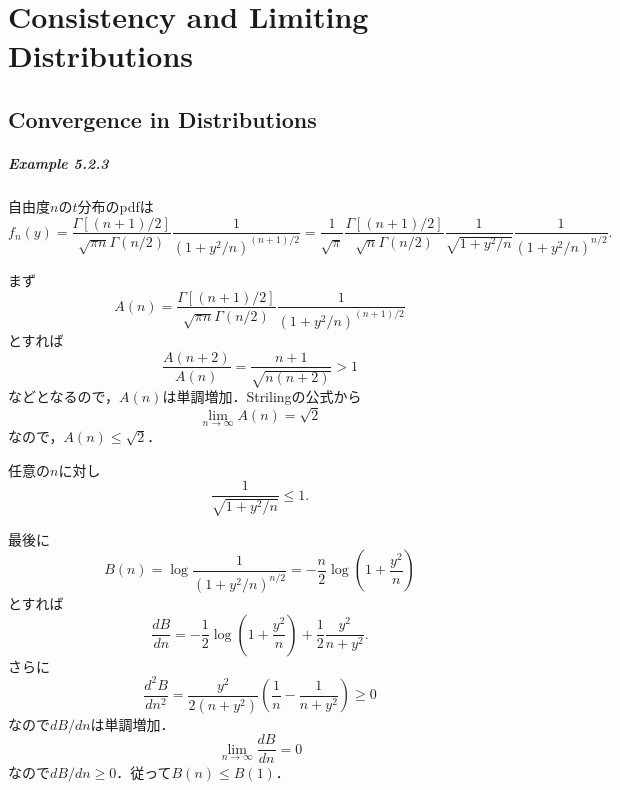 \chapter{Consistency and Limiting Distributions}
\setcounter{section}{1}
\section{Convergence in Distributions}
\paragraph{Example 5.2.3}
自由度\(n\)の\(t\)分布のpdfは
\[
f_n(y) = \frac{\Gamma[(n+1)/2]}{\sqrt{\pi n}\Gamma(n/2)} \frac{1}{(1+y^2/n)^{(n+1)/2}}
= \frac{1}{\sqrt{\pi}} \frac{\Gamma[(n+1)/2]}{\sqrt{n}\Gamma(n/2)} \frac{1}{\sqrt{1+y^2/n}} \frac{1}{(1+y^2/n)^{n/2}} .
\]

まず
\[ A(n) = \frac{\Gamma[(n+1)/2]}{\sqrt{\pi n}\Gamma(n/2)} \frac{1}{(1+y^2/n)^{(n+1)/2}} \]
とすれば
\[ \frac{A(n+2)}{A(n)} = \frac{n+1}{\sqrt{n(n+2)}} > 1 \]
などとなるので，\(A(n)\)は単調増加．Strilingの公式から
\[ \lim_{n\to\infty} A(n) = \sqrt{2} \]
なので，\(A(n) \leq \sqrt{2}\)．

任意の\(n\)に対し
\[ \frac{1}{\sqrt{1+y^2/n}} \leq 1 . \]

最後に
\[ B(n) = \log \frac{1}{(1+y^2/n)^{n/2}} = - \frac{n}{2} \log \left(1+\frac{y^2}{n}\right) \]
とすれば
\[ \frac{dB}{dn} = - \frac{1}{2} \log \left(1+\frac{y^2}{n}\right) + \frac{1}{2} \frac{y^2}{n+y^2} . \]
さらに
\[ \frac{d^2B}{dn^2} = \frac{y^2}{2(n+y^2)} \left(\frac{1}{n} - \frac{1}{n+y^2}\right) \geq 0 \]
なので\(dB/dn\)は単調増加．
\[ \lim_{n\to\infty} \frac{dB}{dn} = 0 \]
なので\(dB/dn \geq 0\)．従って\(B(n) \leq B(1)\)．

